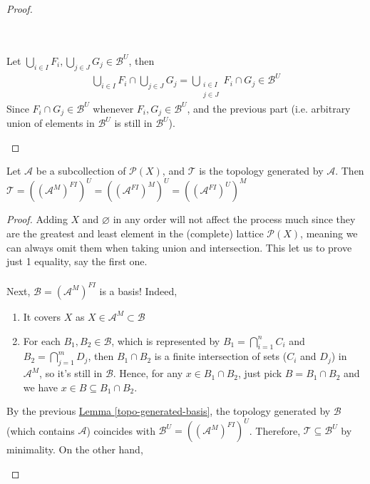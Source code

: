 \documentclass{treatise}
\begin{document}
\begin{shaded}
\begin{proof}
\begin{enumerate}
    \\
    \\
    Let $\bigcup_{i \in I} F_i, \bigcup_{j \in J} G_j \in \mathcal{B}^U$, then
    \begin{align*}
        \bigcup_{i \in I} F_i \cap \bigcup_{j \in J} G_j = \bigcup_{\substack{i \in I \\ j \in J}} F_i \cap G_j \in \mathcal{B}^U
    \end{align*}
    Since $F_i \cap G_j \in \mathcal{B}^U$ whenever $F_i, G_j \in \mathcal{B}^U$, and the previous part (i.e. arbitrary union of elements in $\mathcal{B}^U$ is still in $\mathcal{B}^U$). 
\end{enumerate}
\end{proof}
\begin{theorem} \label{topo-gen-steps}
Let $\mathcal{A}$ be a subcollection of $\mathcal{P}(X)$, and $\mathcal{T}$ is the topology generated by $\mathcal{A}$. Then $\mathcal{T} = ((\mathcal{A}^{M})^{FI})^{U} = ((\mathcal{A}^{FI})^{M})^{U} = ((\mathcal{A}^{FI})^{U})^{M}$
\end{theorem}
\begin{proof}
Adding $X$ and $\varnothing$ in any order will not affect the process much since they are the greatest and least element in the (complete) lattice $\mathcal{P}(X)$, meaning we can always omit them when taking union and intersection. This let us to prove just 1 equality, say the first one.
\\
\\
Next, $\mathcal{B} = (\mathcal{A}^M)^{FI}$ is a basis! Indeed,
\begin{enumerate}
    \item It covers $X$ as $X \in \mathcal{A}^M \subset \mathcal{B}$
    \item For each $B_1, B_2 \in \mathcal{B}$, which is represented by $B_1 = \bigcap_{i = 1}^n C_i$ and $B_2 = \bigcap_{j = 1}^m D_j$, then $B_1 \cap B_2$ is a finite intersection of sets ($C_i$ and $D_j$) in $\mathcal{A}^M$, so it's still in $\mathcal{B}$. Hence, for any $x \in B_1 \cap B_2$, just pick $B = B_1 \cap B_2$ and we have $x \in B \subseteq B_1 \cap B_2$.
\end{enumerate}
By the previous \hyperref[topo-generated-basis]{Lemma \ref*{topo-generated-basis}}, the topology generated by $\mathcal{B}$ (which contains $\mathcal{A}$) coincides with $\mathcal{B}^U = ((\mathcal{A}^{M})^{FI})^{U}$. Therefore, $\mathcal{T} \subseteq \mathcal{B}^U$ by minimality. On the other hand,
\begin{enumerate}

\end{enumerate}
\end{proof}
\end{shaded}
\end{document}
